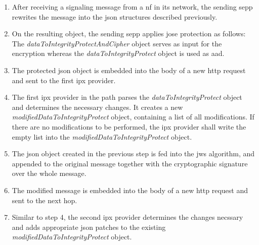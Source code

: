 \begin{enumerate}[wide, labelwidth=!, labelindent=0pt]
    \item After receiving a signaling message from a \gls{nf} in its network, the sending \gls{sepp} rewrites the message into the \gls{json} structures described previously.
    \item On the resulting object, the sending \gls{sepp} applies \gls{jose} protection as follows: The \textit{dataToIntegrityProtectAndCipher} object serves as input for the encryption whereas the \textit{dataToIntegrityProtect} object is used as \gls{aad}.
    \item The protected \gls{json} object is embedded into the body of a new \gls{http} request and sent to the first \gls{ipx} provider.
    \item The first \gls{ipx} provider in the path parses the \textit{dataToIntegrityProtect} object and determines the necessary changes. It creates a new \textit{modifiedDataToIntegrityProtect} object, containing a list of all modifications. If there are no modifications to be performed, the \gls{ipx} provider shall write the empty list into the \textit{modifiedDataToIntegrityProtect} object.
    \item The \gls{json} object created in the previous step is fed into the \gls{jws} algorithm, and appended to the original message together with the cryptographic signature over the whole message.
    \item The modified message is embedded into the body of a new \gls{http} request and sent to the next hop.
    \item Similar to step 4, the second \gls{ipx} provider determines the changes necssary and adds appropriate \gls{json} patches to the existing \textit{modifiedDataToIntegrityProtect} object.

\end{enumerate}
